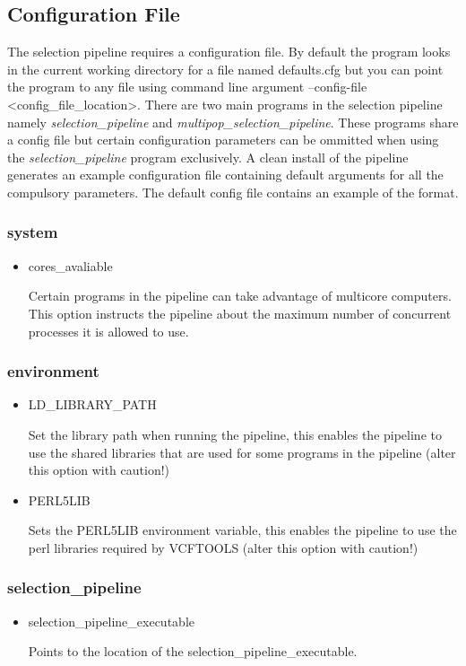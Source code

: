 \documentclass[a4paper,10pt]{article}
\begin{document}
\subsection{Configuration File}
The selection pipeline requires a configuration file. By default the
program looks in the current working directory for a file named
defaults.cfg but you can point the program to any file using command
line argument --config-file <config\_file\_location>. There are two
main programs in the selection pipeline namely
\emph{selection\_pipeline} and \emph{multipop\_selection\_pipeline}. These
programs share a config file but certain configuration parameters can
be ommitted when using the \emph{selection\_pipeline} program
exclusively. A clean install of the pipeline generates an example
configuration file containing default arguments for all the compulsory
parameters. The default config file contains an example of the format.
\subsubsection{system}
\begin{itemize}
\item cores\_avaliable

Certain programs in the pipeline can take advantage of multicore
computers. This option instructs the pipeline about the maximum number
of concurrent processes it is allowed to use.
\end{itemize}
\subsubsection{environment}
\begin{itemize}
\item LD\_LIBRARY\_PATH

Set the library path when running the pipeline, this enables the
pipeline to use the shared libraries that are used for some programs
in the pipeline (alter this option with caution!)

\item PERL5LIB

Sets the PERL5LIB environment variable, this enables the pipeline to
use the perl libraries required by VCFTOOLS (alter this option with
caution!)

\end{itemize}
\subsubsection{selection\_pipeline}
\begin{itemize}
\item selection\_pipeline\_executable

Points to the location of the selection\_pipeline\_executable. 
\end{itemize}
\end{document}
